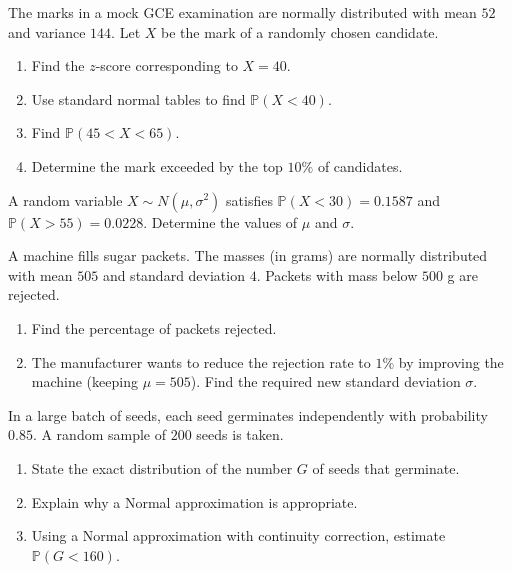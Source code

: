 \documentclass[11pt]{article}
\newcounter{popsec}
\newcounter{popsub}
\newcommand{\courssub}[1]{%
  \stepcounter{popsub}%
  \par\vspace{9pt}\noindent{\popxbold\fontsize{11.5}{13}\selectfont\color{popink}{\color{poporange}\thepopsec.\thepopsub}\hspace{6pt}#1}\par\nopagebreak\vspace{4pt}
}
\begin{document}
\begin{exercice}
The marks in a mock GCE examination are normally distributed with mean $52$ and variance $144$.  
Let $X$ be the mark of a randomly chosen candidate.
\begin{enumerate}
\item Find the $z$-score corresponding to $X = 40$.
\item Use standard normal tables to find $\mathbb{P}(X < 40)$.
\item Find $\mathbb{P}(45 < X < 65)$.
\item Determine the mark exceeded by the top $10\%$ of candidates.
\end{enumerate}
\end{exercice}

\courssub{I practise}

\begin{exercice}
A random variable $X \sim N(\mu, \sigma^2)$ satisfies  
$\mathbb{P}(X < 30) = 0.1587$ and $\mathbb{P}(X > 55) = 0.0228$.  
Determine the values of $\mu$ and $\sigma$.
\end{exercice}

\begin{exercice}
A machine fills sugar packets. The masses (in grams) are normally distributed with mean $505$ and standard deviation $4$. Packets with mass below $500$ g are rejected.
\begin{enumerate}
\item Find the percentage of packets rejected.
\item The manufacturer wants to reduce the rejection rate to $1\%$ by improving the machine (keeping $\mu = 505$). Find the required new standard deviation $\sigma$.
\end{enumerate}
\end{exercice}

\begin{exercice}
In a large batch of seeds, each seed germinates independently with probability $0.85$. A random sample of $200$ seeds is taken.
\begin{enumerate}
\item State the exact distribution of the number $G$ of seeds that germinate.
\item Explain why a Normal approximation is appropriate.
\item Using a Normal approximation with continuity correction, estimate $\mathbb{P}(G < 160)$.
\end{enumerate}
\end{exercice}
\end{document}

